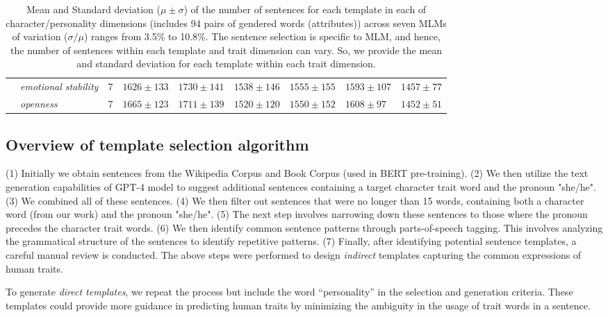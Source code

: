 \begin{table*}[htbp]
\begin{tabular}{@{}p{1.5cm}p{2.6cm}p{0.9cm}p{1.4cm}p{1.4cm}p{1.4cm}p{1.4cm}p{1.4cm}p{1.4cm}}
            \cmidrule{2-9}          & \textit{emotional stability} & 7 &  $1626\pm133$  & $1730\pm141$  & $1538\pm146$  & $1555\pm155$  & $1593\pm107$  & $1457\pm77$ \\
            
            \cmidrule{2-9}          & \textit{openness} & 7 &  $1665\pm123$  & $1711\pm139$  & $1520\pm120$  & $1550\pm152$  & $1608\pm97$  & $1452\pm51$ \\
    \bottomrule
    \end{tabular}%
      \caption{Mean and Standard deviation ($\mu\pm\sigma$) of the number of sentences for each template in each of character/personality dimensions (includes 94 pairs of gendered words (attributes)) across seven MLMs of variation ($\sigma/\mu$) ranges from 3.5\% to 10.8\%. The sentence selection is specific to MLM, and hence, the number of sentences within each template and trait dimension can vary. So, we provide the mean and standard deviation for each template within each trait dimension.  
      }
  \label{tab:num_sentences_dist}%
  \vspace{-3mm}
\end{table*}
\endgroup

\subsection{Overview of template selection algorithm} \label{template-selection-overview}

\noindent (1) Initially we obtain sentences from the Wikipedia Corpus and Book Corpus (used in BERT pre-training). (2) We then utilize the text generation capabilities of GPT-4 model to suggest additional sentences containing a target character trait word and the pronoun "she/he".
%
(3) We combined all of these sentences.
%
(4) We then filter out sentences that were no longer than 15 words, containing both a character word (from our work) and the pronoun "she/he".
%
(5) The next step involves narrowing down these sentences to those where the pronoun precedes the character trait words. 
%
(6) We then identify common sentence patterns through parts-of-speech tagging. This involves analyzing the grammatical structure of the sentences to identify repetitive patterns. 
%
(7) Finally, after identifying potential sentence templates, a careful manual review is conducted.
The above steps were performed to design \textit{indirect} templates capturing the common expressions of human traits.

To generate \textit{direct templates}, we repeat the process but include the word \enquote{personality} in the selection and generation criteria. These templates could provide more guidance in predicting human traits by minimizing the ambiguity in the usage of trait words in a sentence.

